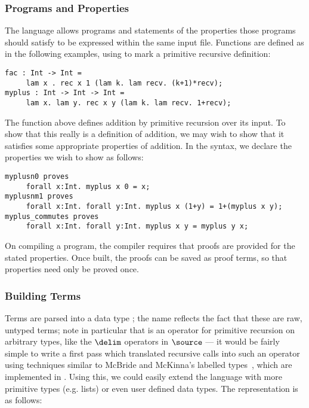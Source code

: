 \subsubsection{Programs and Properties}

The \Funl{} language allows programs and statements of the properties
those programs should satisfy to be expressed within the same input file.
Functions are defined as in the following examples, using 
to mark a primitive recursive definition:

\begin{verbatim}
fac : Int -> Int =
     lam x . rec x 1 (lam k. lam recv. (k+1)*recv);
myplus : Int -> Int -> Int =
     lam x. lam y. rec x y (lam k. lam recv. 1+recv);
\end{verbatim}

The  function above defines addition by primitive
recursion over its input. To show that this really is a definition of
addition, we may wish to show that it satisfies some appropriate
properties of addition. In the \Funl{} syntax, we declare the
properties we wish to show as follows:

\begin{verbatim}
myplusn0 proves 
     forall x:Int. myplus x 0 = x;
myplusnm1 proves 
     forall x:Int. forall y:Int. myplus x (1+y) = 1+(myplus x y);
myplus_commutes proves 
     forall x:Int. forall y:Int. myplus x y = myplus y x;
\end{verbatim}

On compiling a program, the compiler requires that proofs are provided
for the stated properties. Once built, the proofs can be saved as
proof terms, so that properties need only be proved once.

\subsubsection{Building Terms}
Terms are parsed into a data type ; the name
 reflects the fact that these are raw, untyped terms; note
in particular that  is an operator for primitive recursion
on arbitrary types, like the $\delim$ operators in $\source$ --- it
would be fairly simple to write a first pass which translated
recursive calls into such an operator using techniques similar to
McBride and McKinna's labelled types~\cite{view-left}, which are
implemented in \Ivor{}. Using this, we could easily extend the
language with more primitive types (e.g. lists) or even user defined
data types. The representation is as follows:

